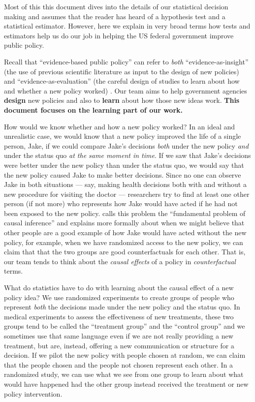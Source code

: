 \documentclass[
  12pt,
]{book}
\theoremstyle{definition}
\theoremstyle{definition}
\theoremstyle{definition}
\theoremstyle{remark}
\begin{document}
Most of this this document dives into the details of our statistical
decision making and assumes that the reader has heard of a hypothesis
test and a statistical estimator. However, here we explain in very broad
terms how tests and estimators help us do our job in helping the US
federal government improve public policy.

Recall that ``evidence-based public policy'' can refer to \emph{both}
``evidence-as-insight'' (the use of previous scientific literature as
input to the design of new policies) and ``evidence-as-evaluation'' (the
careful design of studies to learn about how and whether a new policy
worked) \citep{bowers2019better}. Our team aims to help government
agencies \textbf{design} new policies and also to \textbf{learn} about
how those new ideas work. \textbf{This document focuses on the learning
part of our work.}

How would we know whether and how a new policy worked? In an ideal and
unrealistic case, we would know that a new policy improved the life of a
single person, Jake, if we could compare Jake's decisions \emph{both}
under the new policy \emph{and} under the status quo \emph{at the same
moment in time}. If we saw that Jake's decisions were better under the
new policy than under the status quo, we would say that the new policy
caused Jake to make better decisions. Since no one can observe Jake in
both situations --- say, making health decisions both with and without a
new procedure for visiting the doctor --- researchers try to find at
least one other person (if not more) who represents how Jake would have
acted if he had not been exposed to the new policy.
\citet{holland:1986a} calls this problem the ``fundamental problem of
causal inference'' and explains more formally about when we might
believe that other people are a good example of how Jake would have
acted without the new policy, for example, when we have randomized
access to the new policy, we can claim that that the two groups are good
counterfactuals for each other. That is, our team tends to think about
the \emph{causal effects} of a policy in \emph{counterfactual} terms.

What do statistics have to do with learning about the causal effect of a
new policy idea? We use randomized experiments to create groups of
people who represent \emph{both} the decisions made under the new policy
and the status quo. In medical experiments to assess the effectiveness
of new treatments, these two groups tend to be called the ``treatment
group'' and the ``control group'' and we sometimes use that same
language even if we are not really providing a new treatment, but are,
instead, offering a new communication or structure for a decision. If we
pilot the new policy with people chosen at random, we can claim that the
people chosen and the people not chosen represent each other. In a
randomized study, we can use what we see from one group to learn about
what would have happened had the other group instead received the
treatment or new policy intervention.
\end{document}
